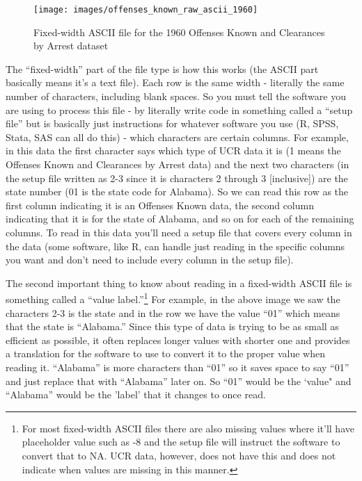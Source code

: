 \documentclass[
  12pt,
  openany]{book}
\begin{document}
\begin{figure}

{\centering \texttt{[image: images/offenses\_known\_raw\_ascii\_1960]} 

}

\caption{Fixed-width ASCII file for the 1960 Offenses Known and Clearances by Arrest dataset}\label{fig:unnamed-chunk-3}
\end{figure}

The ``fixed-width'' part of the file type is how this works (the ASCII part basically means it's a text file). Each row is the same width - literally the same number of characters, including blank spaces. So you must tell the software you are using to process this file - by literally write code in something called a ``setup file'' but is basically just instructions for whatever software you use (R, SPSS, Stata, SAS can all do this) - which characters are certain columns. For example, in this data the first character says which type of UCR data it is (1 means the Offenses Known and Clearances by Arrest data) and the next two characters (in the setup file written as 2-3 since it is characters 2 through 3 {[}inclusive{]}) are the state number (01 is the state code for Alabama). So we can read this row as the first column indicating it is an Offenses Known data, the second column indicating that it is for the state of Alabama, and so on for each of the remaining columns. To read in this data you'll need a setup file that covers every column in the data (some software, like R, can handle just reading in the specific columns you want and don't need to include every column in the setup file).

The second important thing to know about reading in a fixed-width ASCII file is something called a ``value label.''\footnote{For most fixed-width ASCII files there are also missing values where it'll have placeholder value such as -8 and the setup file will instruct the software to convert that to NA. UCR data, however, does not have this and does not indicate when values are missing in this manner.} For example, in the above image we saw the characters 2-3 is the state and in the row we have the value ``01'' which means that the state is ``Alabama.'' Since this type of data is trying to be as small as efficient as possible, it often replaces longer values with shorter one and provides a translation for the software to use to convert it to the proper value when reading it. ``Alabama'' is more characters than ``01'' so it saves space to say ``01'' and just replace that with ``Alabama'' later on. So ``01'' would be the `value" and ``Alabama'' would be the 'label' that it changes to once read.
\end{document}
